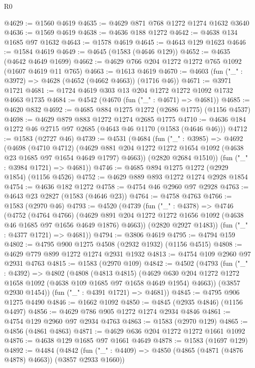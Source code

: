 \begin{lexlean}{R0}
\begin{coremodule}
@4629 := @1560 @4619
@4635 := @4629 @871 @768 @1272 @1274 @1632 @3640
@4636 := @1569 @4619
@4638 := @4636 @188 @1272
@4642 := @4638 @134 @1685 @97 @1632
@4643 := @1578 @4619
@4645 := @4643 @129 @1623
@4646 := @1584 @4619
@4649 := @4645 (@1583 (@4646 @129))
@4652 := @4635 (@4642 @4649 @1699)
@4662 := @4629 @766 @204 @1272 @1272 @765 @1092 (@1607 @4619 @11 @765)
@4663 := @1613 @4619
@4670 := @4603 (fun ("_" : @3972) => @4628 (@4652 (@4662 @4663)) (@1716 @46))
@4671 := @3971 @1721
@4681 := @1724 @4619 @303 @13 @204 @1272 @1272 @1092 @1732 @4663 @1735
@4684 := @4542 (@4670 (fun ("_" : @4671) => @4681))
@4685 := @4620 @832
@4692 := @4685 @884 @1275 @1272 (@2686 @1775) (@1156 @4537)
@4698 := @4629 @879 @883 @1272 @1274 @2685 @1775
@4710 := @4636 @184 @1272 @46 @2715 @97 @2685 (@4643 @46 @1170 (@1583 (@4646 @46)))
@4712 := @1583 (@2727 @46)
@4739 := @4531
    (@4684
      (fun ("_" : @3985) =>
      @4692
        (@4698
          (@4710 @4712)
          (@4629 @881 @204 @1272 @1272 @1654 @1092 (@4638 @23 @1685 @97 @1654 @4649 @1797) @4663))
        (@2820 @2684 @1510))
      (fun ("_" : @3984 @1721) => @4681))
@4746 := @4685 @894 @1275 @1272 (@2929 @1854) (@1156 @4526)
@4752 := @4629 @889 @893 @1272 @1274 @2928 @1854
@4754 := @4636 @182 @1272
@4758 := @4754 @46 @2960 @97 @2928
@4763 := @4643 @23 @2827 (@1583 (@4646 @23))
@4764 := @4758 @4763
@4766 := @1583 (@2970 @46)
@4793 := @4520
    (@4739
      (fun ("_" : @4378) =>
      @4746
        (@4752
          (@4764 @4766)
          (@4629 @891 @204 @1272 @1272 @1656 @1092 (@4638 @46 @1685 @97 @1656 @4649 @1876) @4663))
        (@2820 @2927 @1483))
      (fun ("_" : @4377 @1721) => @4681))
@4794 := @3806 @4619
@4795 := @4794 @159
@4802 := @4795 @900 @1275 @4508 (@2932 @1932) (@1156 @4515)
@4808 := @4629 @779 @899 @1272 @1274 @2931 @1932
@4813 := @4754 @109 @2960 @97 @2931 @4763
@4815 := @1583 (@2970 @109)
@4842 := @4502
    (@4793
      (fun ("_" : @4392) =>
      @4802
        (@4808
          (@4813 @4815)
          (@4629 @630 @204 @1272 @1272 @1658 @1092 (@4638 @109 @1685 @97 @1658 @4649 @1954) @4663))
        (@3857 @2930 @1454))
      (fun ("_" : @4391 @1721) => @4681))
@4845 := @4795 @906 @1275 @4490
@4846 := @1662 @1092
@4850 := @4845 (@2935 @4846) (@1156 @4497)
@4856 := @4629 @786 @905 @1272 @1274 @2934 @4846
@4861 := @4754 @129 @2960 @97 @2934 @4763
@4863 := @1583 (@2970 @129)
@4865 := @4856 (@4861 @4863)
@4871 := @4629 @636 @204 @1272 @1272 @1661 @1092
@4876 := @4638 @129 @1685 @97 @1661 @4649
@4878 := @1583 (@1697 @129)
@4892 := @4484
    (@4842
      (fun ("_" : @4409) => @4850 (@4865 (@4871 (@4876 @4878) @4663)) (@3857 @2933 @1660))

\end{coremodule}
\end{lexlean}
